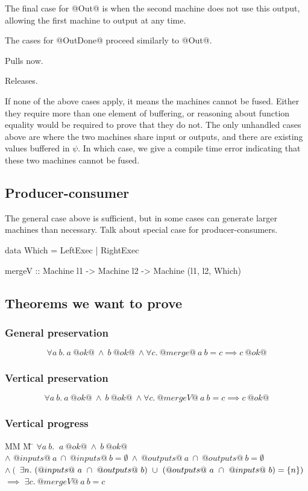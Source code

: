The final case for @Out@ is when the second machine does not use this output, allowing the first machine to output at any time.

The cases for @OutDone@ proceed similarly to @Out@.

Pulls now.

Releases.

If none of the above cases apply, it means the machines cannot be fused.
Either they require more than one element of buffering, or reasoning about function equality would be required to prove that they do not.
The only unhandled cases above are where the two machines share input or outputs, and there are existing values buffered in $\psi$.
In which case, we give a compile time error indicating that these two machines cannot be fused.




\subsection{Producer-consumer}
The general case above is sufficient, but in some cases can generate larger machines than necessary.
Talk about special case for producer-consumers.

\begin{code}
data Which = LeftExec | RightExec

mergeV :: Machine l1 -> Machine l2
       -> Machine (l1, l2, Which)
\end{code}

\subsection{Theorems we want to prove}
\subsubsection{General preservation}
$$
\forall a~b.\ a~@ok@~\wedge~b~@ok@~\wedge \forall c.\ @merge@~a~b = c \implies c~@ok@
$$

\subsubsection{Vertical preservation}
$$
\forall a~b.\ a~@ok@~\wedge~b~@ok@~\wedge \forall c.\ @mergeV@~a~b = c \implies c~@ok@
$$

\subsubsection{Vertical progress}
\begin{tabbing}
MM \= M \= \kill
$ \forall a~b.\ $ \> \>
$a~@ok@~\wedge~b~@ok@$ \\
\> $\wedge$ \> $@inputs@~a~\cap~@inputs@~b=\emptyset~\wedge~@outputs@~a~\cap~@outputs@~b=\emptyset$ \\
\> $\wedge~($ \> $\exists n.\ (@inputs@~a~\cap~@outputs@~b)~\cup~(@outputs@~a~\cap~@inputs@~b) = \sgl{n})$ \\
 $\implies$ \> \> $\exists c.\ @mergeV@~a~b=c$
\end{tabbing}


